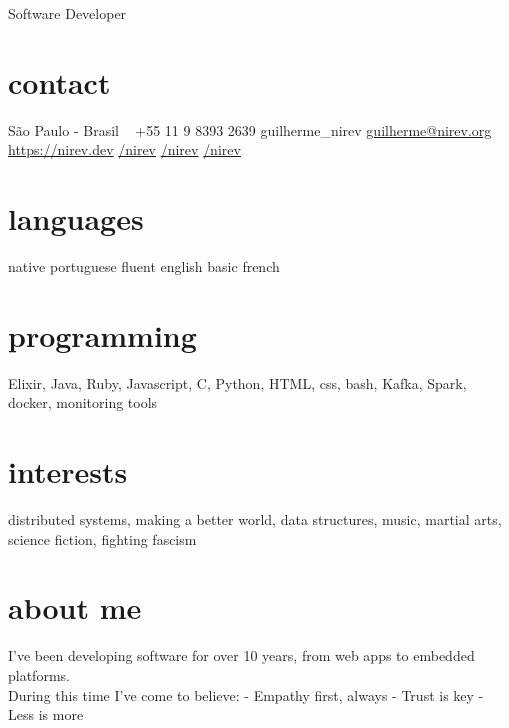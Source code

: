 \documentclass{nirev-cv}
\begin{document}
       {Software Developer}


\begin{aside}
  \section{contact}
    São Paulo - Brasil
    ~
    +55 11 9 8393 2639
    {\faSkype } guilherme\_nirev
    \href{mailto:guilherme@nirev.org}{guilherme@nirev.org}
    \href{https://nirev.dev}{https://nirev.dev}
    \href{https://github.com/nirev}{\faGithub /nirev}
    \href{https://twitter.com/nirev}{\faTwitter /nirev}
    \href{https://linkedin.com/in/nirev}{\faLinkedin /nirev}
  \section{languages}
    native portuguese
    fluent english
    basic french
  \section{programming}
    Elixir, Java, Ruby, Javascript, C, Python,
    HTML, css, bash,
    Kafka, Spark, docker, 
    monitoring tools
  \section{interests}
distributed systems, making a better world, data structures, music, martial arts, science fiction, fighting fascism
\end{aside}

\section{about me}

I've been developing software for over 10 years, from web apps to embedded platforms. \\
During this time I've come to believe:
- Empathy first, always
- Trust is key
- Less is more
\end{document}
